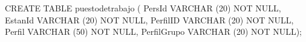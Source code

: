 \lstset{caption=Crear tabla ``puestosdetrabajo'',label=sql:crearTablaPuestosdetrabajo}
\begin{SQL}
CREATE TABLE puestodetrabajo (
PersId VARCHAR (20) NOT NULL,
EstanId VARCHAR (20) NOT NULL,
PerfilID VARCHAR (20) NOT NULL,
Perfil VARCHAR (50) NOT NULL,
PerfilGrupo VARCHAR (20) NOT NULL);
\end{SQL}